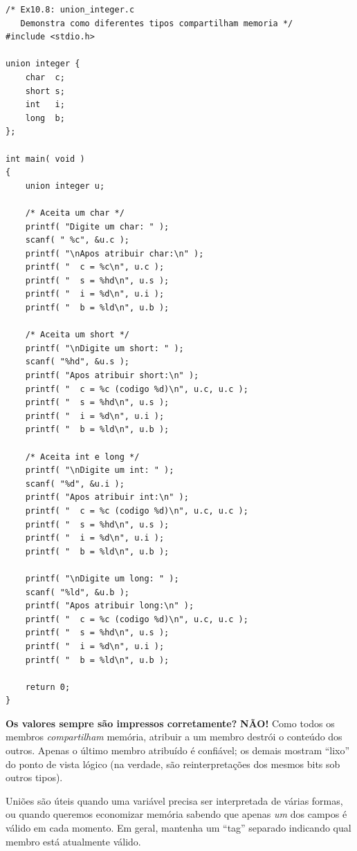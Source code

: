 \documentclass[12pt,a4paper]{article}
\begin{document}
\begin{respostabox}
\begin{lstlisting}
/* Ex10.8: union_integer.c
   Demonstra como diferentes tipos compartilham memoria */
#include <stdio.h>

union integer {
    char  c;
    short s;
    int   i;
    long  b;
};

int main( void )
{
    union integer u;

    /* Aceita um char */
    printf( "Digite um char: " );
    scanf( " %c", &u.c );
    printf( "\nApos atribuir char:\n" );
    printf( "  c = %c\n", u.c );
    printf( "  s = %hd\n", u.s );
    printf( "  i = %d\n", u.i );
    printf( "  b = %ld\n", u.b );

    /* Aceita um short */
    printf( "\nDigite um short: " );
    scanf( "%hd", &u.s );
    printf( "Apos atribuir short:\n" );
    printf( "  c = %c (codigo %d)\n", u.c, u.c );
    printf( "  s = %hd\n", u.s );
    printf( "  i = %d\n", u.i );
    printf( "  b = %ld\n", u.b );

    /* Aceita int e long */
    printf( "\nDigite um int: " );
    scanf( "%d", &u.i );
    printf( "Apos atribuir int:\n" );
    printf( "  c = %c (codigo %d)\n", u.c, u.c );
    printf( "  s = %hd\n", u.s );
    printf( "  i = %d\n", u.i );
    printf( "  b = %ld\n", u.b );

    printf( "\nDigite um long: " );
    scanf( "%ld", &u.b );
    printf( "Apos atribuir long:\n" );
    printf( "  c = %c (codigo %d)\n", u.c, u.c );
    printf( "  s = %hd\n", u.s );
    printf( "  i = %d\n", u.i );
    printf( "  b = %ld\n", u.b );

    return 0;
}
\end{lstlisting}

\textbf{Os valores sempre são impressos corretamente?} \textbf{NÃO!} Como todos
os membros \textit{compartilham} memória, atribuir a um membro destrói o conteúdo
dos outros. Apenas o último membro atribuído é confiável; os demais mostram
``lixo'' do ponto de vista lógico (na verdade, são reinterpretações dos mesmos
bits sob outros tipos).

\begin{boaprática}
  Uniões são úteis quando uma variável precisa ser interpretada de várias formas,
  ou quando queremos economizar memória sabendo que apenas \textit{um} dos campos
  é válido em cada momento. Em geral, mantenha um ``tag'' separado indicando qual
  membro está atualmente válido.
\end{boaprática}
\end{respostabox}
\end{document}
